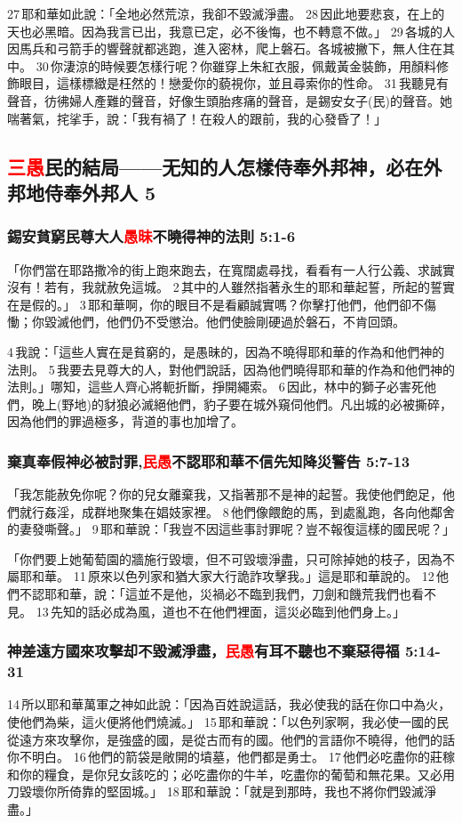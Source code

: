 27 耶和華如此說：「全地必然荒涼，我卻不毀滅淨盡。 28 因此地要悲哀，在上的天也必黑暗。因為我言已出，我意已定，必不後悔，也不轉意不做。」 29 各城的人因馬兵和弓箭手的響聲就都逃跑，進入密林，爬上磐石。各城被撇下，無人住在其中。 30 你淒涼的時候要怎樣行呢？你雖穿上朱紅衣服，佩戴黃金裝飾，用顏料修飾眼目，這樣標緻是枉然的！戀愛你的藐視你，並且尋索你的性命。 31 我聽見有聲音，彷彿婦人產難的聲音，好像生頭胎疼痛的聲音，是錫安女子(民)的聲音。她喘著氣，挓挲手，說：「我有禍了！在殺人的跟前，我的心發昏了！」


\subsection{\textcolor{red}{三愚}民的結局——无知的人怎樣侍奉外邦神，必在外邦地侍奉外邦人 5}
\subsubsection{錫安貧窮民尊大人\textcolor{red}{愚昧}不曉得神的法則 5:1-6}
「你們當在耶路撒冷的街上跑來跑去，在寬闊處尋找，看看有一人行公義、求誠實沒有！若有，我就赦免這城。 2 其中的人雖然指著永生的耶和華起誓，所起的誓實在是假的。」 3 耶和華啊，你的眼目不是看顧誠實嗎？你擊打他們，他們卻不傷慟；你毀滅他們，他們仍不受懲治。他們使臉剛硬過於磐石，不肯回頭。

4 我說：「這些人實在是貧窮的，是愚昧的，因為不曉得耶和華的作為和他們神的法則。 5 我要去見尊大的人，對他們說話，因為他們曉得耶和華的作為和他們神的法則。」哪知，這些人齊心將軛折斷，掙開繩索。 6 因此，林中的獅子必害死他們，晚上(野地)的豺狼必滅絕他們，豹子要在城外窺伺他們。凡出城的必被撕碎，因為他們的罪過極多，背道的事也加增了。

\subsubsection{棄真奉假神必被討罪,\textcolor{red}{民愚}不認耶和華不信先知降災警告 5:7-13}
「我怎能赦免你呢？你的兒女離棄我，又指著那不是神的起誓。我使他們飽足，他們就行姦淫，成群地聚集在娼妓家裡。 8 他們像餵飽的馬，到處亂跑，各向他鄰舍的妻發嘶聲。」 9 耶和華說：「我豈不因這些事討罪呢？豈不報復這樣的國民呢？」


「你們要上她葡萄園的牆施行毀壞，但不可毀壞淨盡，只可除掉她的枝子，因為不屬耶和華。 11 原來以色列家和猶大家大行詭詐攻擊我。」這是耶和華說的。 
12 他們不認耶和華，說：「這並不是他，災禍必不臨到我們，刀劍和饑荒我們也看不見。 13 先知的話必成為風，道也不在他們裡面，這災必臨到他們身上。」

\subsubsection{神差遠方國來攻擊却不毀滅淨盡，\textcolor{red}{民愚}有耳不聽也不棄惡得福 5:14-31}
14 所以耶和華萬軍之神如此說：「因為百姓說這話，我必使我的話在你口中為火，使他們為柴，這火便將他們燒滅。」 15 耶和華說：「以色列家啊，我必使一國的民從遠方來攻擊你，是強盛的國，是從古而有的國。他們的言語你不曉得，他們的話你不明白。 16 他們的箭袋是敞開的墳墓，他們都是勇士。 17 他們必吃盡你的莊稼和你的糧食，是你兒女該吃的；必吃盡你的牛羊，吃盡你的葡萄和無花果。又必用刀毀壞你所倚靠的堅固城。」 18 耶和華說：「就是到那時，我也不將你們毀滅淨盡。」


